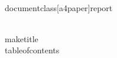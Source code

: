 \\documentclass[a4paper]{report}
\begin{document}
    \\maketitle
    \\tableofcontents

    \

\
\end{document}
